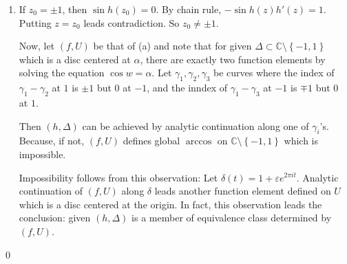 \begin{problem}[10.1]
\begin{enumerate}[label = (\alph*)]
		\item If $z_0 = \pm 1$, then $ \sin h(z_0)  = 0$.
			By chain rule, $-\sin h(z) h'(z) = 1$. Putting $z=z_0$ leads contradiction.
			So $z_0 \ne \pm 1$.

			Now, let $(f, U)$ be that of (a) and note that for given $\Delta \subset \mathbb{C} \setminus\left\{ -1, 1 \right\}$ which is a disc centered at $\alpha$, there are exactly two function elements by solving the equation $\cos w = \alpha$.	
			Let $\gamma_1, \gamma_2, \gamma_3$ be curves where the index of $\gamma_1 - \gamma_2$ at $1$ is $\pm 1$ but $0$ at $-1$, and the inndex of $\gamma_1 - \gamma_3$ at $-1$ is $\mp 1$ but $0$ at $1$.

			Then $(h, \Delta)$ can be achieved by analytic continuation along one of $\gamma_i$'s.
			Because, if not, $(f, U)$ defines global $\arccos$ on $\mathbb{C} \setminus \left\{ -1, 1 \right\}$ which is impossible.

			Impossibility follows from this observation: Let $\delta(t) = 1+\varepsilon e^{2\pi i t}$. Analytic continuation of $(f, U)$ along $\delta$ leads another function element defined on $U$ which is a disc centered at the origin.
			In fact, this observation leads the conclusion: given $(h, \Delta)$ is a member of equivalence class determined by $(f, U)$.
	\end{enumerate}
\qed
\end{problem}

